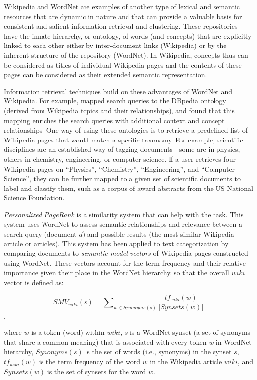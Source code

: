 \documentclass[]{krantz}
\begin{document}
Wikipedia and WordNet are examples of another type of lexical and
semantic resources that are dynamic in nature and that can provide a
valuable basis for consistent and salient information retrieval and
clustering. These repositories have the innate hierarchy, or ontology,
of words (and concepts) that are explicitly linked to each other either
by inter-document links (Wikipedia) or by the inherent structure of the
repository (WordNet). In Wikipedia, concepts thus can be considered as
titles of individual Wikipedia pages and the contents of these pages can
be considered as their extended semantic representation.

Information retrieval techniques build on these advantages of WordNet
and Wikipedia. For example, \citet{meij-09} mapped search queries to the
DBpedia ontology (derived from Wikipedia topics and their
relationships), and found that this mapping enriches the search queries
with additional context and concept relationships. One way of using
these ontologies is to retrieve a predefined list of Wikipedia pages
that would match a specific taxonomy. For example, scientific
disciplines are an established way of tagging documents---some are in
physics, others in chemistry, engineering, or computer science. If a
user retrieves four Wikipedia pages on ``Physics'', ``Chemistry'',
``Engineering'', and ``Computer Science'', they can be further mapped to
a given set of scientific documents to label and classify them, such as
a corpus of award abstracts from the US National Science Foundation.

\emph{Personalized PageRank} is a similarity system that can help with
the task. This system uses WordNet to assess semantic relationships and
relevance between a search query (document \(d\)) and possible results
(the most similar Wikipedia article or articles). This system has been
applied to text categorization \citep{navigli-11} by comparing documents
to \emph{semantic model vectors} of Wikipedia pages constructed using
WordNet. These vectors account for the term frequency and their relative
importance given their place in the WordNet hierarchy, so that the
overall \(wiki\) vector is defined as:

\[SMV_{wiki}(s) = \sum\nolimits_{w\in Synonyms(s)} \frac{tf_{wiki}(w)}{|Synsets(w)|}\],

where \(w\) is a token (word) within \(wiki\), \(s\) is a WordNet synset
(a set of synonyms that share a common meaning) that is associated with
every token \(w\) in WordNet hierarchy, \(Synonyms(s)\) is the set of
words (i.e., synonyms) in the synset \(s\), \(tf_{wiki}(w)\) is the term
frequency of the word \(w\) in the Wikipedia article \(wiki\), and
\(Synsets(w)\) is the set of synsets for the word \(w\).
\end{document}
